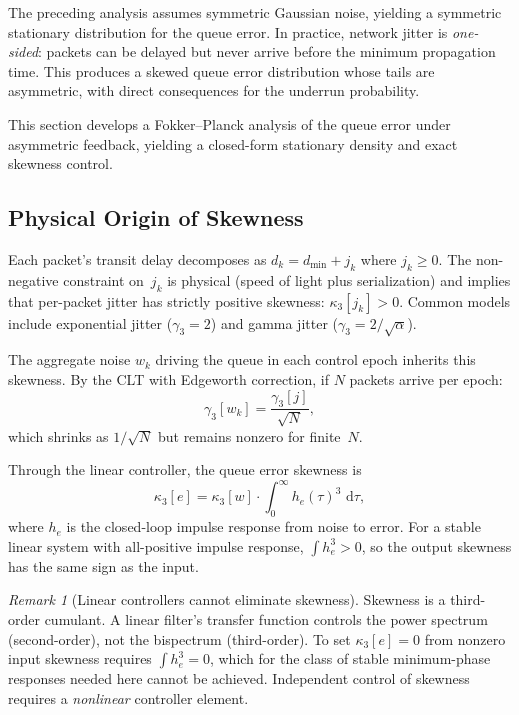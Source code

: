 \documentclass[11pt, a4paper]{article}
\theoremstyle{definition}
\theoremstyle{plain}
\theoremstyle{remark}
\newtheorem{remark}{Remark}[section]
\newcommand{\dd}{\,\mathrm{d}}                   %
\begin{document}
The preceding analysis assumes symmetric Gaussian noise, yielding
a symmetric stationary distribution for the queue error.  In practice,
network jitter is \emph{one-sided}: packets can be delayed but never
arrive before the minimum propagation time.  This produces a
skewed queue error distribution whose tails are asymmetric,
with direct consequences for the underrun probability.

This section develops a Fokker--Planck analysis of the queue error
under asymmetric feedback, yielding a closed-form stationary density
and exact skewness control.

\subsection{Physical Origin of Skewness}%
\label{sec:skew-origin}

Each packet's transit delay decomposes as
$d_k = d_{\min} + j_k$ where $j_k \geq 0$.  The non-negative
constraint on~$j_k$ is physical (speed of light plus serialization)
and implies that per-packet jitter has strictly positive skewness:
$\kappa_3[j_k] > 0$.  Common models include exponential jitter
($\gamma_3 = 2$) and gamma jitter ($\gamma_3 = 2/\sqrt{\alpha}$).

The aggregate noise $w_k$ driving the queue in each control epoch
inherits this skewness.  By the CLT with Edgeworth correction, if
$N$ packets arrive per epoch:
\begin{equation}\label{eq:epoch-skew}
  \gamma_3[w_k] = \frac{\gamma_3[j]}{\sqrt{N}},
\end{equation}
which shrinks as $1/\sqrt{N}$ but remains nonzero for finite~$N$.

Through the linear controller, the queue error skewness is
\begin{equation}\label{eq:skew-propagation}
  \kappa_3[e] = \kappa_3[w] \cdot \int_0^\infty h_e(\tau)^3\,\dd\tau,
\end{equation}
where $h_e$ is the closed-loop impulse response from noise to
error.  For a stable linear system with all-positive impulse
response, $\int h_e^3 > 0$, so the output skewness has the same
sign as the input.

\begin{remark}[Linear controllers cannot eliminate skewness]
  Skewness is a third-order cumulant.  A linear filter's transfer
  function controls the power spectrum (second-order), not the
  bispectrum (third-order).  To set $\kappa_3[e] = 0$ from nonzero
  input skewness requires $\int h_e^3 = 0$, which for the class of
  stable minimum-phase responses needed here cannot be achieved.
  Independent control of skewness requires a \emph{nonlinear}
  controller element.
\end{remark}
\end{document}
